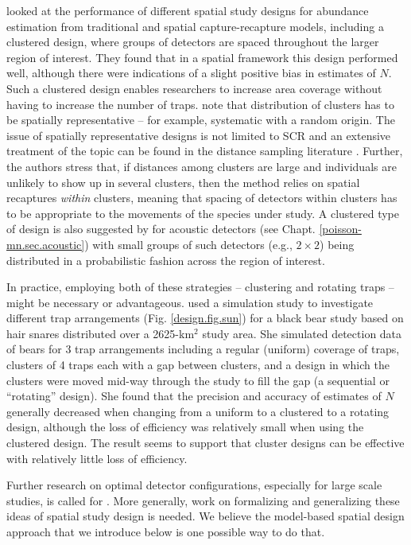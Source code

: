 \citet{efford_fewster:2012} looked at the performance of different
spatial study designs for abundance estimation from traditional and
spatial capture-recapture models, including a clustered design, where
groups of detectors are spaced throughout the larger region of
interest. They found that in a spatial framework this design performed
well, although there were indications of a slight positive bias in
estimates of $N$. Such a clustered design enables researchers to
increase area coverage without having to increase the number of
traps. \citet{efford_fewster:2012} note that distribution of clusters
has to be spatially representative -- for example, systematic with a
random origin.  The issue of spatially representative designs is not
limited to SCR and an extensive treatment of the topic can be found in
the distance sampling literature \citep{buckland_etal:2001}. Further,
the authors stress that, if distances among clusters are large and
individuals are unlikely to show up in several clusters, then the
method relies on spatial recaptures {\it within} clusters, meaning
that spacing of detectors within clusters has to be appropriate to the
movements of the species under study.  A clustered type of design is
also suggested by \citet{efford_etal:2009ecol} for acoustic detectors
(see Chapt. \ref{poisson-mn.sec.acoustic}) with small groups of such
detectors (e.g., $2 \times 2$) being distributed in a probabilistic
fashion across the region of interest.

In practice, employing both of these strategies -- clustering and
rotating traps -- might be necessary or advantageous.
\citet{sun:2013} used a simulation study to investigate different trap
arrangements (Fig. \ref{design.fig.sun}) for a black bear study based
on hair snares distributed over a 2625-km$^2$ study area. She
simulated detection data of bears for 3 trap arrangements including a
regular (uniform) coverage of traps, clusters of 4 traps each
with a gap between clusters, and a design in which the clusters were moved mid-way through the study to fill the gap (a
sequential or ``rotating'' design).  She found that the precision and
accuracy of estimates of $N$ generally decreased when changing from a
uniform to a clustered to a rotating design, although the loss of
efficiency was relatively small when using the clustered design. The
result seems to support that cluster designs can be effective with
relatively little loss of efficiency.

Further research on optimal detector configurations, especially for
large scale studies, is called for \citep{efford_fewster:2012}. More
generally, work on formalizing and generalizing these ideas of spatial
study design is needed.  We believe the model-based spatial design
approach that we introduce below is one possible way to do that.

